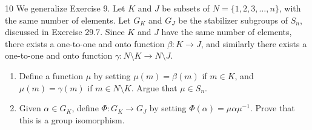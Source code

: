 \begin{problem}{10}
    We generalize Exercise 9. Let $K$ and $J$ be subsets of $N = \{1, 2, 3, \ldots, n\}$,
    with the same number of elements. Let $G_K$ and $G_J$ be the stabilizer subgroups of
    $S_n$, discussed in Exercise 29.7. Since $K$ and $J$ have the same number of elements,
    there exists a one-to-one and onto function $\beta : K \to J$, and similarly there
    exists a one-to-one and onto function $\gamma : N \setminus K \to N \setminus J$.
    \begin{enumerate}
        \item[(a)] Define a function $\mu$ by setting $\mu(m) = \beta(m)$ if $m \in K$, and
        $\mu(m) = \gamma(m)$ if $m \in N \setminus K$. Argue that $\mu \in S_n$.
        \item[(b)] Given $\alpha \in G_K$, define $\Phi : G_K \to G_J$ by setting
        $\Phi(\alpha) = \mu\alpha\mu^{-1}$. Prove that this is a group isomorphism.
    \end{enumerate}
\end{problem}
\unsolved
